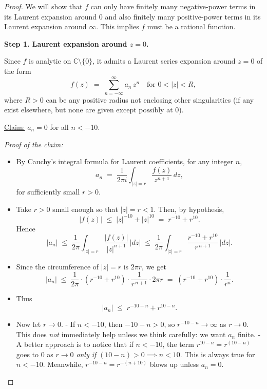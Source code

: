 \documentclass[12pt]{article}
\theoremstyle{definition} %
\theoremstyle{plain} %
\begin{document}
\bigskip

\begin{proof}
We will show that $f$ can only have finitely many negative-power terms in its Laurent expansion around $0$ and also finitely many positive-power terms in its Laurent expansion around $\infty$. This implies $f$ must be a rational function.

\bigskip

\noindent
\textbf{Step 1. Laurent expansion around $z=0$.}

Since $f$ is analytic on $\mathbb{C}\setminus\{0\}$, it admits a Laurent series expansion around $z=0$ of the form
\[
f(z) \;=\; \sum_{n=-\infty}^{\infty} a_n \, z^n
\quad\text{for } 0 < |z| < R,
\]
where $R>0$ can be any positive radius not enclosing other singularities (if any exist elsewhere, but none are given except possibly at $0$).

\medskip

\noindent
\underline{Claim:} $a_n = 0$ for all $n < -10$. 

\smallskip

\noindent
\emph{Proof of the claim:}

\begin{itemize}
\item By Cauchy's integral formula for Laurent coefficients, for any integer $n$,
\[
a_n \;=\; \frac{1}{2\pi i} \int_{|z|=r} \frac{f(z)}{z^{n+1}} \, dz,
\]
for sufficiently small $r>0$.
\item Take $r>0$ small enough so that $|z|=r<1$. Then, by hypothesis,
\[
|f(z)| \;\le\; |z|^{-10} + |z|^{10} \;=\; r^{-10} + r^{10}.
\]
Hence
\[
|a_n| 
\;\le\; \frac{1}{2\pi} \int_{|z|=r} \frac{|f(z)|}{|z|^{n+1}} \, |dz|
\;\le\; \frac{1}{2\pi} \int_{|z|=r} \frac{r^{-10} + r^{10}}{r^{\,n+1}} \,|dz|.
\]
\item Since the circumference of $|z|=r$ is $2\pi r$, we get
\[
|a_n|
\;\le\; \frac{1}{2\pi} \cdot (r^{-10} + r^{10}) \cdot \frac{1}{r^{\,n+1}} \cdot 2\pi r
\;=\; (r^{-10} + r^{10}) \cdot \frac{1}{r^n}.
\]
\item Thus
\[
|a_n| \;\le\; r^{-10-n} + r^{10-n}.
\]
\item Now let $r \to 0$. 
  - If $n < -10$, then $-10 - n > 0$, so $r^{-10-n} \to \infty$ as $r \to 0$. This does \emph{not} immediately help unless we think carefully: we want $a_n$ finite.  
  - A better approach is to notice that if $n < -10$, the term $r^{10-n} = r^{(10-n)}$ goes to $0$ as $r \to 0$ \emph{only if} $(10-n)>0 \implies n<10$. This is always true for $n< -10$. Meanwhile, $r^{-10-n} = r^{-(n+10)}$ blows up unless $a_n = 0$. 
\end{itemize}


\end{proof}
\end{document}

